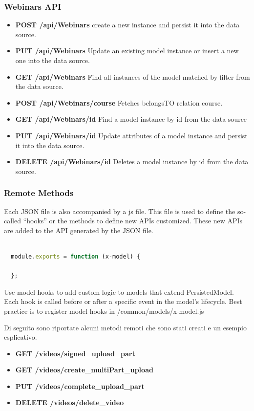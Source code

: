 \subsubsection{Webinars API}
\begin{itemize}
\item \textbf{POST /api/Webinars} create a new instance and persist it into the data source.
\item \textbf{PUT /api/Webinars} Update an existing model instance or insert a new one into the data source.
\item \textbf{GET /api/Webinars} Find all instances of the model matched by filter from the  data source.
\item \textbf{POST /api/Webinars/course} Fetches belongsTO relation course.
\item \textbf{GET /api/Webinars/id} Find a model instance by id from the data source
\item \textbf{PUT /api/Webinars/id} Update attributes of a model instance and persist it into the data source.
\item \textbf{DELETE /api/Webinars/id} Deletes a model instance by id from the data 
source.
\end{itemize}

 \subsubsection{ Remote Methods }

Each JSON file is also accompanied by a js file. This file is used to define the so-called “hooks” or the methods to define new APIs customized. These new APIs are added to the API generated by the JSON file.

\begin{lstlisting}[language=javascript]

  module.exports = function (x-model) {
  
  };
\end{lstlisting}


Use model hooks to add custom logic to models that extend PersistedModel. Each hook is called before or after a specific event in the model's lifecycle.
Best practice is to register model hooks in /common/models/x-model.js

Di seguito sono riportate alcuni metodi remoti che sono stati creati e un esempio esplicativo.

\begin{itemize}
\item \textbf{GET /videos/signed\_upload\_part }
\item \textbf{GET /videos/create\_multiPart\_upload}
\item \textbf{PUT /videos/complete\_upload\_part }
\item \textbf{DELETE /videos/delete\_video}
\end{itemize}


